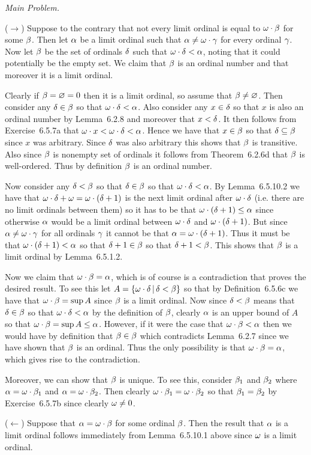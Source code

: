 \begin{solution}
    \emph{Main Problem.}

	($\to$) Suppose to the contrary that not every limit ordinal is equal to $\omega \cdot \beta$ for some $\beta$.
    Then let $\alpha$ be a limit ordinal such that $\alpha \neq \omega \cdot \gamma$ for every ordinal $\gamma$.
    Now let $\beta$ be the set of ordinals $\delta$ such that $\omega \cdot \delta < \alpha$, noting that it could potentially be the empty set.
    We claim that $\beta$ is an ordinal number and that moreover it is a limit ordinal.

    Clearly if $\beta = \varnothing = 0$ then it is a limit ordinal, so assume that $\beta \neq \varnothing$.
    Then consider any $\delta \in \beta$ so that $\omega \cdot \delta < \alpha$.
    Also consider any $x \in \delta$ so that $x$ is also an ordinal number by Lemma~6.2.8 and moreover that $x < \delta$.
    It then follows from Exercise~6.5.7a that $\omega \cdot x < \omega \cdot \delta < \alpha$.
    Hence we have that $x \in \beta$ so that $\delta \subseteq \beta$ since $x$ was arbitrary.
    Since $\delta$ was also arbitrary this shows that $\beta$ is transitive.
    Also since $\beta$ is nonempty set of ordinals it follows from Theorem~6.2.6d that $\beta$ is well-ordered.
    Thus by definition $\beta$ is an ordinal number.

    Now consider any $\delta < \beta$ so that $\delta \in \beta$ so that $\omega \cdot \delta < \alpha$.
    By Lemma~6.5.10.2 we have that $\omega \cdot \delta + \omega = \omega \cdot (\delta + 1)$ is the next limit ordinal after $\omega \cdot \delta$ (i.e. there are no limit ordinals between them) so it has to be that $\omega \cdot (\delta + 1) \leq \alpha$ since otherwise $\alpha$ would be a limit ordinal between $\omega \cdot \delta$ and $\omega \cdot (\delta + 1)$.
    But since $\alpha \neq \omega \cdot \gamma$ for all ordinals $\gamma$ it cannot be that $\alpha = \omega \cdot (\delta + 1)$.
    Thus it must be that $\omega \cdot (\delta + 1) < \alpha$ so that $\delta + 1 \in \beta$ so that $\delta + 1 < \beta$.
    This shows that $\beta$ is a limit ordinal by Lemma~6.5.1.2.

    Now we claim that $\omega \cdot \beta = \alpha$, which is of course is a contradiction that proves the desired result.
    To see this let $A = \left\{ \omega \cdot \delta \,|\, \delta < \beta \right\}$ so that by Definition~6.5.6c we have that $\omega \cdot \beta = \sup{A}$ since $\beta$ is a limit ordinal.
    Now since $\delta < \beta$ means that $\delta \in \beta$ so that $\omega \cdot \delta < \alpha$ by the definition of $\beta$, clearly $\alpha$ is an upper bound of $A$ so that $\omega \cdot \beta = \sup{A} \leq \alpha$.
    However, if it were the case that $\omega \cdot \beta < \alpha$ then we would have by definition that $\beta \in \beta$ which contradicts Lemma~6.2.7 since we have shown that $\beta$ is an ordinal.
    Thus the only possibility is that $\omega \cdot \beta = \alpha$, which gives rise to the contradiction.

    Moreover, we can show that $\beta$ is unique.
    To see this, consider $\beta_1$ and $\beta_2$ where $\alpha = \omega \cdot \beta_1$ and $\alpha = \omega \cdot \beta_2$.
    Then clearly $\omega \cdot \beta_1 = \omega \cdot \beta_2$ so that $\beta_1 = \beta_2$ by Exercise~6.5.7b since clearly $\omega \neq 0$.

    ($\leftarrow$) Suppose that $\alpha = \omega \cdot \beta$ for some ordinal $\beta$.
    Then the result that $\alpha$ is a limit ordinal follows immediately from Lemma~6.5.10.1 above since $\omega$ is a limit ordinal. \qedsymbol
\end{solution}

